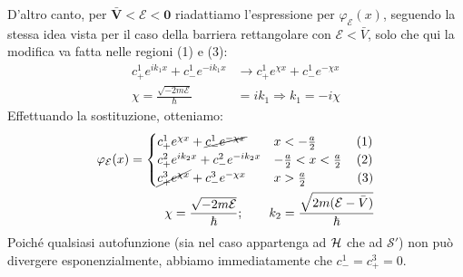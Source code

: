 \documentclass[../../FisicaTeorica.tex]{subfiles}
\begin{document}
D'altro canto, per $\bm{\bar{V}< \mathcal{E}<0}$ riadattiamo l'espressione per $\varphi_\mathcal{E}(x)$, seguendo la stessa idea vista per il caso della barriera rettangolare con $\mathcal{E} < \bar{V}$, solo che qui la modifica va fatta nelle regioni (1) e (3):
\begin{align*}
c^1_+ e^{ik_1 x} + c^1_- e^{-ik_1 x} &\to c^1_+ e^{\chi x} + c^1_- e^{-\chi x} \\
\chi = \frac{\sqrt{-2m\mathcal{E}}}{\hbar}  &= ik_1 \Rightarrow k_1 = -i\chi
\end{align*}
Effettuando la sostituzione, otteniamo:
\begin{align*}
\varphi_\mathcal{E}(x)=\begin{cases}
c^1_+ e^{\chi x} +\cancel{ c^1_- e^{-\chi x}} & x<-\frac{a}{2} \quad \qquad \, (1)\\
c^2_+ e^{ik_2 x} + c^2_- e^{-ik_2 x} & -\frac{a}{2}<x<\frac{a}{2}\quad \, (2)\\
\cancel{c^3_+ e^{\chi x}}+c^3_- e^{-\chi x} & x > \frac{a}{2} \ \quad \ \qquad \, \, (3)
\end{cases}\\
\chi = \frac{\sqrt{-2m\mathcal{E}}}{\hbar}; \qquad k_2 = \frac{\sqrt{2m(\mathcal{E}-\bar{V})}}{\hbar}
\end{align*}
Poiché qualsiasi autofunzione (sia nel caso appartenga ad $\mathcal{H}$ che ad $\mathcal{S}'$) non può divergere esponenzialmente, abbiamo immediatamente che $c^1_- = c^3_+ = 0$.\\
\end{document}
